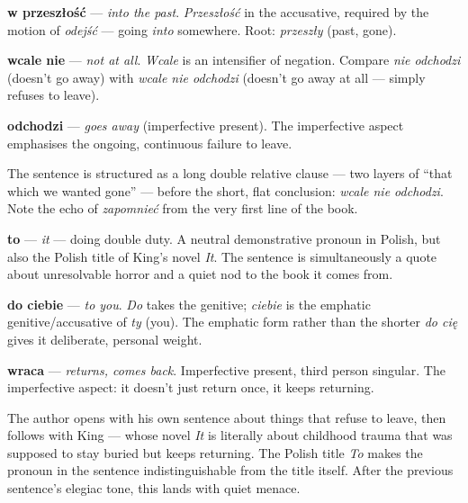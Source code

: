 \textbf{w przeszłość} — \textit{into the past}. \textit{Przeszłość} in the 
accusative, required by the motion of \textit{odejść} — going \textit{into} 
somewhere. Root: \textit{przeszły} (past, gone).

\textbf{wcale nie} — \textit{not at all}. \textit{Wcale} is an intensifier 
of negation. Compare \textit{nie odchodzi} (doesn't go away) with 
\textit{wcale nie odchodzi} (doesn't go away at all — simply refuses to leave).

\textbf{odchodzi} — \textit{goes away} (imperfective present). The imperfective 
aspect emphasises the ongoing, continuous failure to leave.

The sentence is structured as a long double relative clause — two layers of 
``that which we wanted gone'' — before the short, flat conclusion: 
\textit{wcale nie odchodzi}. Note the echo of \textit{zapomnieć} from the 
very first line of the book.

\vspace{1em}


\textbf{to} — \textit{it} — doing double duty. A neutral demonstrative pronoun 
in Polish, but also the Polish title of King's novel \textit{It}. The sentence 
is simultaneously a quote about unresolvable horror and a quiet nod to the 
book it comes from.

\textbf{do ciebie} — \textit{to you}. \textit{Do} takes the genitive; 
\textit{ciebie} is the emphatic genitive/accusative of \textit{ty} (you). 
The emphatic form rather than the shorter \textit{do cię} gives it 
deliberate, personal weight.

\textbf{wraca} — \textit{returns, comes back}. Imperfective present, third 
person singular. The imperfective aspect: it doesn't just return once, 
it keeps returning.

The author opens with his own sentence about things that refuse to leave, 
then follows with King — whose novel \textit{It} is literally about childhood 
trauma that was supposed to stay buried but keeps returning. The Polish title 
\textit{To} makes the pronoun in the sentence indistinguishable from the 
title itself. After the previous sentence's elegiac tone, this lands with 
quiet menace.

